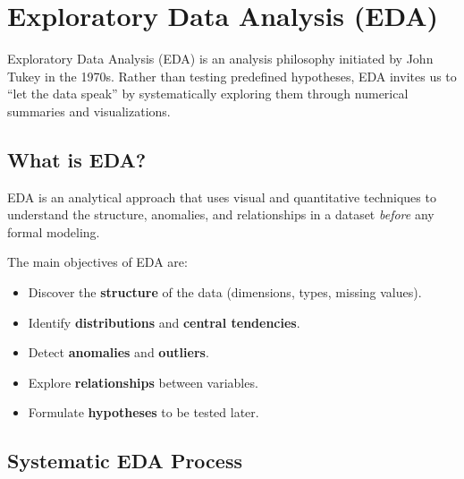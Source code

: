 \chapter{Exploratory Data Analysis (EDA)}
\label{ch:eda}

\begin{intuition}
Exploratory Data Analysis (EDA) is an analysis philosophy initiated by John Tukey in the 1970s. Rather than testing predefined hypotheses, EDA invites us to ``let the data speak'' by systematically exploring them through numerical summaries and visualizations.
\end{intuition}

\section{What is EDA?}

\begin{definition}
EDA is an analytical approach that uses visual and quantitative techniques to understand the structure, anomalies, and relationships in a dataset \emph{before} any formal modeling.
\end{definition}

The main objectives of EDA are:
\begin{itemize}
    \item Discover the \textbf{structure} of the data (dimensions, types, missing values).
    \item Identify \textbf{distributions} and \textbf{central tendencies}.
    \item Detect \textbf{anomalies} and \textbf{outliers}.
    \item Explore \textbf{relationships} between variables.
    \item Formulate \textbf{hypotheses} to be tested later.
\end{itemize}

\section{Systematic EDA Process}

